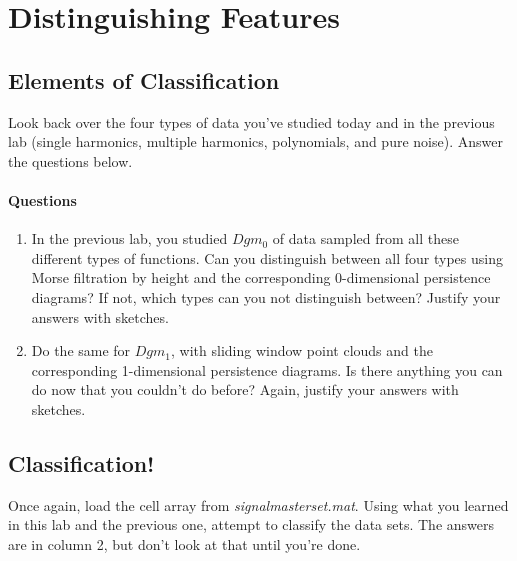 \documentclass[12pt,twoside]{article}
\newcommand{\qns}{\paragraph*{Questions}}
\begin{document}
\pagebreak
\section{Distinguishing Features}

\subsection{Elements of Classification}
Look back over the four types of data you've studied today and in the previous lab (single harmonics, multiple harmonics, polynomials, and pure noise).  Answer the questions below.

\qns\begin{enumerate}
       \item In the previous lab, you studied $Dgm_0$ of data sampled from all these different types of functions.  Can you distinguish between all four types using Morse filtration by height and the corresponding 0-dimensional persistence diagrams?  If not, which types can you not distinguish between?  Justify your answers with sketches.\vfill
       \item Do the same for $Dgm_1$, with sliding window point clouds and the corresponding 1-dimensional persistence diagrams.  Is there anything you can do now that you couldn't do before?  Again, justify your answers with sketches.\vfill
    \end{enumerate}

\pagebreak

\subsection{Classification!}

Once again, load the cell array from \emph{signalmasterset.mat}.  Using what you learned in this lab and the previous one, attempt to classify the data sets.  The answers are in column 2, but don't look at that until you're done.\vfill
\label{LastPage}
\end{document}
